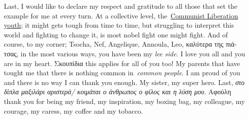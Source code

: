 \documentclass[master=elt, cleveref, autoref, masteroption=eg]{kulemt}
\begin{document}
\begin{preface}
   Last, I would like to declare my respect and gratitude to all those
   that set the example for me at every turn.
   At a collective level, the~\href{https://nka.gr/ti-einai-i-nka/}{Communist Liberation youth}; 
   it might gets tough from time to time, but struggling to 
   interpret this world and fighting to change it,
   is most nobel fight one might fight. 
   And of course, to my corner;
   Tsocha, Nef,
   Angelique,
   Annoula, %
   Leo,
   \foreignlanguage{greek}{καλύτερα της πιάτσας},
   in the most various ways, you have been my \textit{lee side}. 
   I love you all and you are in my heart.
   \foreignlanguage{greek}{Σκουπίδια} this applies for all of you too! 
   My parents that have tought me that there is nothing common in~\textit{common people}.
   I am proud of you and there is no way I can thank you enough. 
   My sister, my super hero. 
   Last, \foreignlanguage{greek}{\textit{στο δίπλα μαξιλάρι αριστερά/ κοιμάται ο άνθρωπος ο φίλος και η λύση μου}}. 
   \foreignlanguage{greek}{Αφούλη} thank you for being my friend, my inspiration, 
   my boxing bag, my colleague, my courage, my caress, my coffee and my tobacco. \\


\end{preface}
\end{document}
